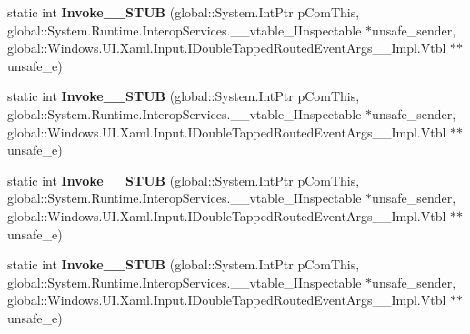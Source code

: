 \begin{DoxyCompactItemize}
\item 
\mbox{\label{struct_windows_1_1_u_i_1_1_xaml_1_1_input_1_1_double_tapped_event_handler_____impl_1_1_vtbl_ad16fd73d829f1fc61ff0c531c9f35d0c}} 
static int {\bfseries Invoke\+\_\+\+\_\+\+S\+T\+UB} (global\+::\+System.\+Int\+Ptr p\+Com\+This, global\+::\+System.\+Runtime.\+Interop\+Services.\+\_\+\+\_\+vtable\+\_\+\+I\+Inspectable $\ast$unsafe\+\_\+sender, global\+::\+Windows.\+U\+I.\+Xaml.\+Input.\+I\+Double\+Tapped\+Routed\+Event\+Args\+\_\+\+\_\+\+Impl.\+Vtbl $\ast$$\ast$unsafe\+\_\+e)
\item 
\mbox{\label{struct_windows_1_1_u_i_1_1_xaml_1_1_input_1_1_double_tapped_event_handler_____impl_1_1_vtbl_ad16fd73d829f1fc61ff0c531c9f35d0c}} 
static int {\bfseries Invoke\+\_\+\+\_\+\+S\+T\+UB} (global\+::\+System.\+Int\+Ptr p\+Com\+This, global\+::\+System.\+Runtime.\+Interop\+Services.\+\_\+\+\_\+vtable\+\_\+\+I\+Inspectable $\ast$unsafe\+\_\+sender, global\+::\+Windows.\+U\+I.\+Xaml.\+Input.\+I\+Double\+Tapped\+Routed\+Event\+Args\+\_\+\+\_\+\+Impl.\+Vtbl $\ast$$\ast$unsafe\+\_\+e)
\item 
\mbox{\label{struct_windows_1_1_u_i_1_1_xaml_1_1_input_1_1_double_tapped_event_handler_____impl_1_1_vtbl_ad16fd73d829f1fc61ff0c531c9f35d0c}} 
static int {\bfseries Invoke\+\_\+\+\_\+\+S\+T\+UB} (global\+::\+System.\+Int\+Ptr p\+Com\+This, global\+::\+System.\+Runtime.\+Interop\+Services.\+\_\+\+\_\+vtable\+\_\+\+I\+Inspectable $\ast$unsafe\+\_\+sender, global\+::\+Windows.\+U\+I.\+Xaml.\+Input.\+I\+Double\+Tapped\+Routed\+Event\+Args\+\_\+\+\_\+\+Impl.\+Vtbl $\ast$$\ast$unsafe\+\_\+e)
\item 
\mbox{\label{struct_windows_1_1_u_i_1_1_xaml_1_1_input_1_1_double_tapped_event_handler_____impl_1_1_vtbl_ad16fd73d829f1fc61ff0c531c9f35d0c}} 
static int {\bfseries Invoke\+\_\+\+\_\+\+S\+T\+UB} (global\+::\+System.\+Int\+Ptr p\+Com\+This, global\+::\+System.\+Runtime.\+Interop\+Services.\+\_\+\+\_\+vtable\+\_\+\+I\+Inspectable $\ast$unsafe\+\_\+sender, global\+::\+Windows.\+U\+I.\+Xaml.\+Input.\+I\+Double\+Tapped\+Routed\+Event\+Args\+\_\+\+\_\+\+Impl.\+Vtbl $\ast$$\ast$unsafe\+\_\+e)

\end{DoxyCompactItemize}
